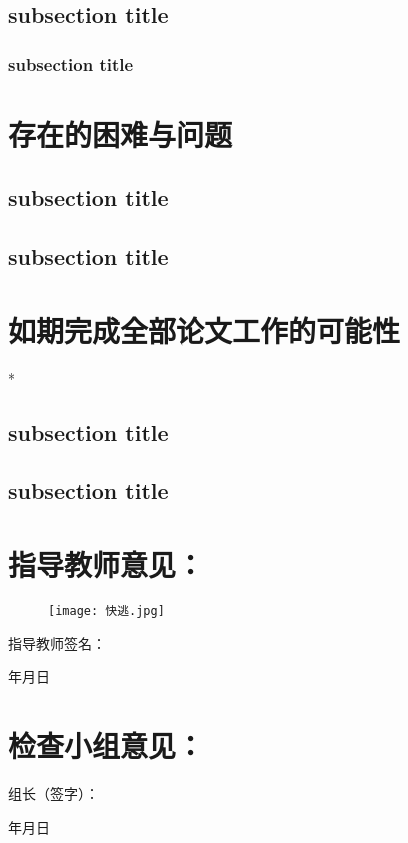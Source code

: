 \subsection{subsection title}
\subsubsection{subsection title}
\lipsum[4-5]

\section{存在的困难与问题}

\subsection{subsection title}
\lipsum[2-3]
\subsection{subsection title}
\lipsum[4-5]

\section{如期完成全部论文工作的可能性}*

\subsection{subsection title}
\lipsum[2-3]
\subsection{subsection title}
\lipsum[4-5]

\clearpage
\section*{指导教师意见：}

\begin{figure}[h]
    \centering
    \texttt{[image: 快逃.jpg]}
\end{figure}

\vspace{24bp}
\hfill 指导教师签名：\hspace{8\ccwd}

\vspace{24bp}
\hfill 年\hspace{2\ccwd}月\hspace{2\ccwd}日

\vspace{24bp}
\section*{检查小组意见：}

\vspace{80bp}
\hfill 组长（签字）：\hspace{8\ccwd}

\vspace{24bp}
\hfill 年\hspace{2\ccwd}月\hspace{2\ccwd}日
